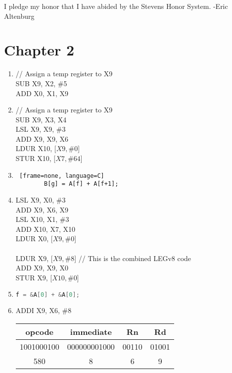 \documentclass[11pt,letterpaper]{article}
\newcommand\setProbNum[1]{\setcounter{enumi}{\numexpr#1-1\relax}}
\begin{document}
I pledge my honor that I have abided by the Stevens Honor System. -Eric Altenburg


\section*{Chapter 2}

\begin{enumerate}
	\setProbNum{1}
	\item 
	// Assign a temp register to X9\\
	SUB		X9, X2, \#5\\
	ADD		X0, X1, X9
	
	\setProbNum{3}
	\item
	// Assign a temp register to X9\\
	SUB		X9, X3, X4\\
	LSL 		X9, X9, \#3\\
	ADD		X9, X9, X6\\
	LDUR	X10, $[X9, \#0$]\\
	STUR	X10, $[X7, \#64$]
	
	\setProbNum{4}
	\item
	\begin{lstlisting} [frame=none, language=C]
		B[g] = A[f] + A[f+1];
	\end{lstlisting}
	
	\setProbNum{5}
	\item
	LSL 		X9, X0, \#3\\
	ADD 	X9, X6, X9\\
	LSL		X10, X1, \#3\\
	ADD 	X10, X7, X10\\
	LDUR 	X0, $[X9, \#0$]\\\\
	
	LDUR	X9, $[X9, \#8$] // This is the combined LEGv8 code\\
	ADD 	X9, X9, X0\\
	STUR 	X9, $[X10, \#0$] 
	
	\setProbNum{9}
	\item
	\begin{lstlisting}[frame=none, language=C]
		f = &A[0] + &A[0];
	\end{lstlisting}
	
	\setProbNum{10}
	\item
	ADDI	X9, X6, \#8\\
	\begin{tabular}{| c | c | c | c |}
		\hline
		opcode & immediate & Rn & Rd\\
		\hline
		1001000100 & 000000001000 & 00110 & 01001\\
		\hline
		580 & 8 & 6 & 9\\
		\hline
	\end{tabular}	
	

\end{enumerate}
\end{document}
